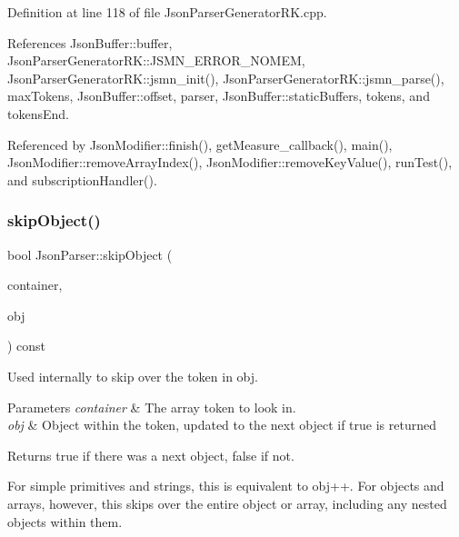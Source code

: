 Definition at line 118 of file Json\+Parser\+Generator\+R\+K.\+cpp.



References Json\+Buffer\+::buffer, Json\+Parser\+Generator\+R\+K\+::\+J\+S\+M\+N\+\_\+\+E\+R\+R\+O\+R\+\_\+\+N\+O\+M\+EM, Json\+Parser\+Generator\+R\+K\+::jsmn\+\_\+init(), Json\+Parser\+Generator\+R\+K\+::jsmn\+\_\+parse(), max\+Tokens, Json\+Buffer\+::offset, parser, Json\+Buffer\+::static\+Buffers, tokens, and tokens\+End.



Referenced by Json\+Modifier\+::finish(), get\+Measure\+\_\+callback(), main(), Json\+Modifier\+::remove\+Array\+Index(), Json\+Modifier\+::remove\+Key\+Value(), run\+Test(), and subscription\+Handler().

\mbox{\label{class_json_parser_a182ab93b3639f0a99f37f9101eb48361}} 
\subsubsection{\texorpdfstring{skip\+Object()}{skipObject()}}
{\footnotesize\ttfamily bool Json\+Parser\+::skip\+Object (\begin{DoxyParamCaption}\item[{const \hyperlink{struct_json_parser_generator_r_k_1_1jsmntok__t}{Json\+Parser\+Generator\+R\+K\+::jsmntok\+\_\+t} $\ast$}]{container,  }\item[{const \hyperlink{struct_json_parser_generator_r_k_1_1jsmntok__t}{Json\+Parser\+Generator\+R\+K\+::jsmntok\+\_\+t} $\ast$\&}]{obj }\end{DoxyParamCaption}) const}



Used internally to skip over the token in obj. 


\begin{DoxyParams}{Parameters}
{\em container} & The array token to look in.\\
\hline
{\em obj} & Object within the token, updated to the next object if true is returned\\
\hline
\end{DoxyParams}
\begin{DoxyReturn}{Returns}
true if there was a next object, false if not.
\end{DoxyReturn}
For simple primitives and strings, this is equivalent to obj++. For objects and arrays, however, this skips over the entire object or array, including any nested objects within them. 

